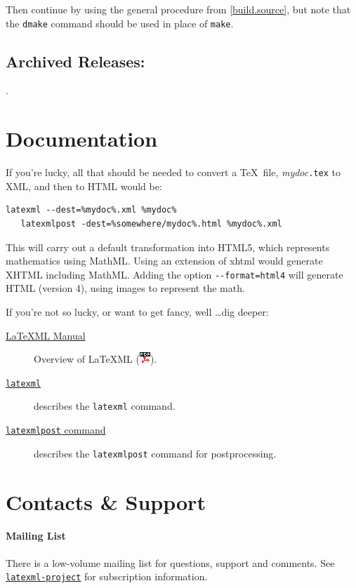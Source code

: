 \documentclass{article}
\newcommand{\PDFIcon}{\includegraphics{pdf}}
\begin{document}
Then continue by using the general procedure from \ref{build.source},
but note that the \texttt{dmake} command should be used in place of \texttt{make}.

\subsection{Archived Releases:}\label{archive}
\AllReleases.

\section{Documentation}\label{docs}
If you're lucky, all that should be needed to convert
a \TeX\ file, \textit{mydoc}\texttt{.tex} to XML, and
then to HTML would be:
\begin{lstlisting}[style=shell]
   latexml --dest=%mydoc%.xml %mydoc%
   latexmlpost -dest=%somewhere/mydoc%.html %mydoc%.xml
\end{lstlisting}
This will carry out a default transformation into HTML5,
which represents mathematics using MathML.  Using an
extension of xhtml would generate XHTML including MathML.
Adding the option \verb|--format=html4| will generate
HTML (version 4), using images to represent the math.

If you're not so lucky, or want to get fancy, well \ldots dig deeper:
\begin{description}
\item[\href{manual/}{LaTeXML Manual}]
    Overview of LaTeXML (\href{manual.pdf}{\PDFIcon}).
\item[\href{manual/commands/latexml.html}{\texttt{latexml}}]
    describes the \texttt{latexml} command.
\item[\href{manual/commands/latexmlpost.html}{\texttt{latexmlpost} command}]
   describes the \texttt{latexmlpost} command for postprocessing.
\end{description}


\section{Contacts \& Support}\label{contact}

\paragraph{Mailing List}
There is a low-volume mailing list for questions, support and comments.
See \href{http://lists.jacobs-university.de/mailman/listinfo/project-latexml}{\texttt{latexml-project}} for subscription information.
\end{document}
